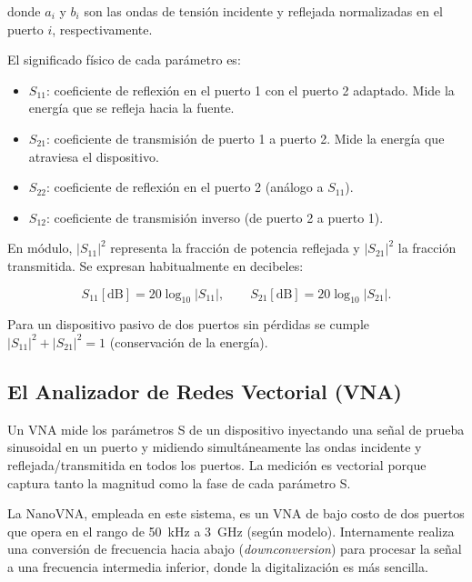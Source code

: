 \noindent donde $a_i$ y $b_i$ son las ondas de tensión incidente y reflejada
normalizadas en el puerto $i$, respectivamente.

El significado físico de cada parámetro es:

\begin{itemize}
    \item $S_{11}$: coeficiente de reflexión en el puerto 1 con el puerto 2
          adaptado. Mide la energía que se refleja hacia la fuente.
    \item $S_{21}$: coeficiente de transmisión de puerto 1 a puerto 2.
          Mide la energía que atraviesa el dispositivo.
    \item $S_{22}$: coeficiente de reflexión en el puerto 2 (análogo a $S_{11}$).
    \item $S_{12}$: coeficiente de transmisión inverso (de puerto 2 a puerto 1).
\end{itemize}

En módulo, $|S_{11}|^2$ representa la fracción de potencia reflejada y
$|S_{21}|^2$ la fracción transmitida. Se expresan habitualmente en decibeles:

\begin{equation}
    S_{11}[\text{dB}] = 20\log_{10}|S_{11}|, \qquad
    S_{21}[\text{dB}] = 20\log_{10}|S_{21}|.
\end{equation}

Para un dispositivo pasivo de dos puertos sin pérdidas se cumple
$|S_{11}|^2 + |S_{21}|^2 = 1$ (conservación de la energía).

\newpage
\Encabezado

\subsection{El Analizador de Redes Vectorial (VNA)}
\label{sec:vna}

Un VNA mide los parámetros S de un dispositivo inyectando una señal de
prueba sinusoidal en un puerto y midiendo simultáneamente las ondas incidente
y reflejada/transmitida en todos los puertos. La medición es vectorial porque
captura tanto la magnitud como la fase de cada parámetro S.

La NanoVNA, empleada en este sistema, es un VNA de bajo costo de dos puertos
que opera en el rango de 50~kHz a 3~GHz (según modelo). Internamente realiza
una conversión de frecuencia hacia abajo (\emph{downconversion}) para procesar
la señal a una frecuencia intermedia inferior, donde la digitalización es más
sencilla.

